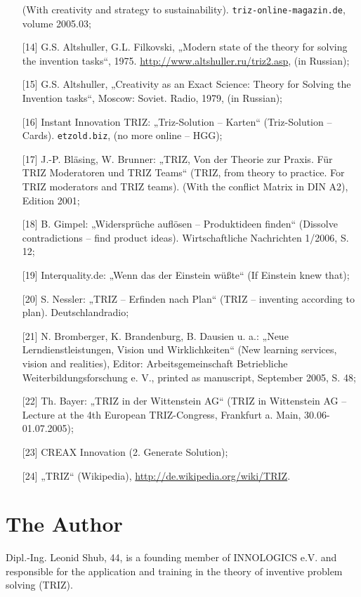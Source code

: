 \documentclass[11pt,a4paper]{article}
\begin{document}
\begin{itemize}
  (With creativity and strategy to sustainability). 
  \texttt{triz-online-magazin.de}, volume 2005.03;
\item[{[14]}] G.S. Altshuller, G.L. Filkovski, „Modern state of the theory for
  solving the invention tasks“, 1975.
  \url{http://www.altshuller.ru/triz2.asp}, (in Russian);
\item[{[15]}] G.S. Altshuller, „Creativity as an Exact Science: Theory for
  Solving the Invention tasks“, Moscow: Soviet. Radio, 1979, (in Russian);
\item[{[16]}] Instant Innovation TRIZ: „Triz-Solution – Karten“ (Triz-Solution
  -- Cards).  \texttt{etzold.biz}, (no more online -- HGG);
\item[{[17]}] J.-P. Bläsing, W. Brunner: „TRIZ, Von der Theorie zur Praxis.
  Für TRIZ Moderatoren und TRIZ Teams“ (TRIZ, from theory to practice. For
  TRIZ moderators and TRIZ teams). (With the conflict Matrix in DIN A2),
  Edition 2001;
\item[{[18]}] B. Gimpel: „Widersprüche auflösen – Produktideen finden“
  (Dissolve contradictions -- find product ideas).  Wirtschaftliche
  Nachrichten 1/2006, S. 12;
\item[{[19]}] Interquality.de: „Wenn das der Einstein wüßte“ (If Einstein knew
  that);
\item[{[20]}] S. Nessler: „TRIZ -- Erfinden nach Plan“ (TRIZ -- inventing
  according to plan).  Deutschlandradio;
\item[{[21]}] N. Bromberger, K. Brandenburg, B. Dausien u. a.: „Neue
  Lerndienstleistungen, Vision und Wirklichkeiten“ (New learning services,
  vision and realities), Editor: Arbeitsgemeinschaft Betriebliche
  Weiterbildungsforschung e. V., printed as manuscript, September 2005, S. 48;
\item[{[22]}] Th. Bayer: „TRIZ in der Wittenstein AG“ (TRIZ in Wittenstein AG
  -- Lecture at the 4th European TRIZ-Congress, Frankfurt a. Main,
  30.06-01.07.2005);
\item[{[23]}] CREAX Innovation (2. Generate Solution);
\item[{[24]}] „TRIZ“ (Wikipedia), \url{http://de.wikipedia.org/wiki/TRIZ}.
\end{itemize}

\section*{The Author}

Dipl.-Ing. Leonid Shub, 44, is a founding member of INNOLOGICS e.V. and
responsible for the application and training in the theory of inventive
problem solving (TRIZ).
\end{document}
